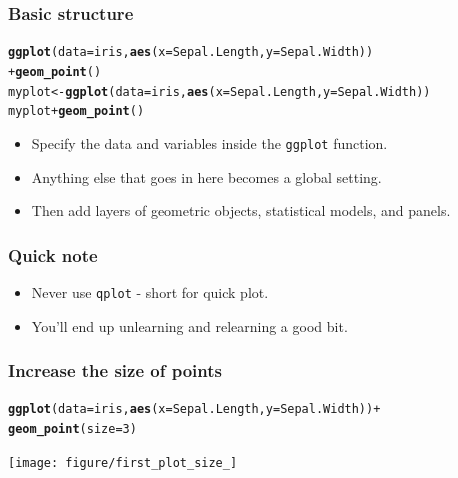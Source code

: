\documentclass{beamer}\usepackage{graphicx, color}
\makeatletter
\newcommand{\hlfunctioncall}[1]{\textcolor[rgb]{0.501960784313725,0,0.329411764705882}{\textbf{#1}}}%
\newenvironment{kframe}{%
 \def\at@end@of@kframe{}%
 \ifinner\ifhmode%
  \def\at@end@of@kframe{\end{minipage}}%
  \begin{minipage}{\columnwidth}%
 \fi\fi%
 \def\FrameCommand##1{\hskip\@totalleftmargin \hskip-\fboxsep
 \colorbox{shadecolor}{##1}\hskip-\fboxsep
     \hskip-\linewidth \hskip-\@totalleftmargin \hskip\columnwidth}%
 \MakeFramed {\advance\hsize-\width
   \@totalleftmargin\z@ \linewidth\hsize
   \@setminipage}}%
 {\par\unskip\endMakeFramed%
 \at@end@of@kframe}
\newenvironment{knitrout}{}{} %
\makeatother
\begin{document}
\begin{frame}[fragile]
\frametitle{Basic structure}
\begin{knitrout}\footnotesize
{}\color{fgcolor}\begin{kframe}
\begin{alltt}
\hlfunctioncall{ggplot}(data = iris, \hlfunctioncall{aes}(x = Sepal.Length, y = Sepal.Width))
 + \hlfunctioncall{geom_point}()
myplot <- \hlfunctioncall{ggplot}(data = iris, \hlfunctioncall{aes}(x = Sepal.Length, y = Sepal.Width))
myplot + \hlfunctioncall{geom_point}()
\end{alltt}
\end{kframe}
\end{knitrout}

\begin{itemize}
\item Specify the data and variables inside the \texttt{ggplot} function.
\item Anything else that goes in here becomes a global setting.
\item Then add layers of geometric objects, statistical models, and panels.
\end{itemize}
\end{frame}

\begin{frame}[fragile]
\frametitle{Quick note}
\begin{itemize}
\item Never use \texttt{qplot} - short for quick plot.
\item You'll end up unlearning and relearning a good bit.
\end{itemize}

\end{frame}


\begin{frame}[fragile]
\frametitle{Increase the size of points}
\begin{knitrout}\footnotesize
{}\color{fgcolor}\begin{kframe}
\begin{alltt}
\hlfunctioncall{ggplot}(data = iris, \hlfunctioncall{aes}(x = Sepal.Length, y = Sepal.Width)) +
\hlfunctioncall{geom_point}(size = 3)
\end{alltt}
\end{kframe}
\texttt{[image: figure/first\_plot\_size\_]} 

\end{knitrout}

\end{frame}
\end{document}
